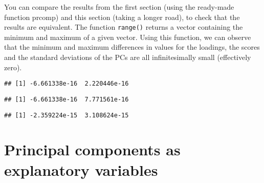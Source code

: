 \documentclass[
]{book}
\newenvironment{Shaded}{\begin{snugshade}}{\end{snugshade}}
\newcommand{\FunctionTok}[1]{\textcolor[rgb]{0.00,0.00,0.00}{#1}}
\newcommand{\NormalTok}[1]{#1}
\newcommand{\SpecialCharTok}[1]{\textcolor[rgb]{0.00,0.00,0.00}{#1}}
\begin{document}
You can compare the results from the first section (using the ready-made function prcomp) and this section (taking a longer road), to check that the results are equivalent. The function \texttt{range()} returns a vector containing the minimum and maximum of a given vector. Using this function, we can observe that the minimum and maximum differences in values for the loadings, the scores and the standard deviations of the PCs are all infinitesimally small (effectively zero).

\begin{Shaded}
\end{Shaded}

\begin{verbatim}
## [1] -6.661338e-16  2.220446e-16
\end{verbatim}

\begin{Shaded}
\end{Shaded}

\begin{verbatim}
## [1] -6.661338e-16  7.771561e-16
\end{verbatim}

\begin{Shaded}
\end{Shaded}

\begin{verbatim}
## [1] -2.359224e-15  3.108624e-15
\end{verbatim}

\hypertarget{principal-components-as-explanatory-variables}{%
\section{Principal components as explanatory variables}\label{principal-components-as-explanatory-variables}}
\end{document}
